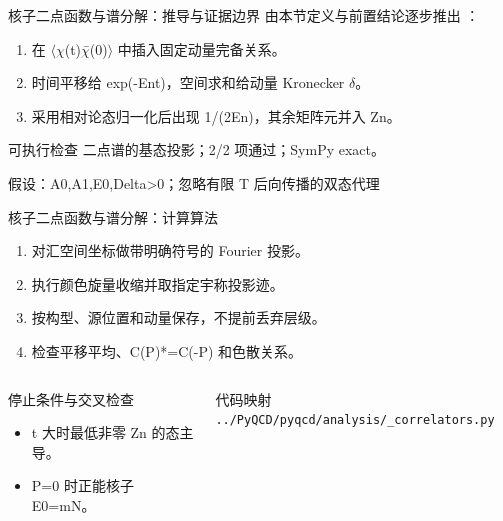 \begin{frame}[t]{核子二点函数与谱分解：推导与证据边界}
\footnotesize
{}\quad 由本节定义与前置结论逐步推出 ：
\begin{enumerate}
\item 在 \ensuremath{\langle}\ensuremath{\chi}(t)\ensuremath{\chi}̄(0)\ensuremath{\rangle} 中插入固定动量完备关系。
\item 时间平移给 exp(-Ent)，空间求和给动量 Kronecker \ensuremath{\delta}。
\item 采用相对论态归一化后出现 1/\allowbreak{}(2En)，其余矩阵元并入 Zn。
\end{enumerate}\begin{block}{可执行检查}
\quad 二点谱的基态投影；2/2 项通过；SymPy exact。
\par\scriptsize 假设：A0,A1,E0,Delta>0；忽略有限 T 后向传播的双态代理
\end{block}
\end{frame}

\begin{frame}[t]{核子二点函数与谱分解：计算算法}
\footnotesize
{}\begin{enumerate}
\item 对汇空间坐标做带明确符号的 Fourier 投影。
\item 执行颜色旋量收缩并取指定宇称投影迹。
\item 按构型、源位置和动量保存，不提前丢弃层级。
\item 检查平移平均、C(P)*=C(-P) 和色散关系。
\end{enumerate}\begin{columns}[T,onlytextwidth]
\begin{block}{停止条件与交叉检查}\scriptsize\begin{itemize}
\item[\CheckMark] t 大时最低非零 Zn 的态主导。
\item[\CheckMark] P=0 时正能核子 E0=mN。
\end{itemize}\end{block}
\begin{block}{代码映射}
\scriptsize \texttt{.\allowbreak{}.\allowbreak{}/\allowbreak{}PyQCD/\allowbreak{}pyqcd/\allowbreak{}analysis/\allowbreak{}\_\allowbreak{}correlators.\allowbreak{}py}
\end{block}\end{columns}\end{frame}

